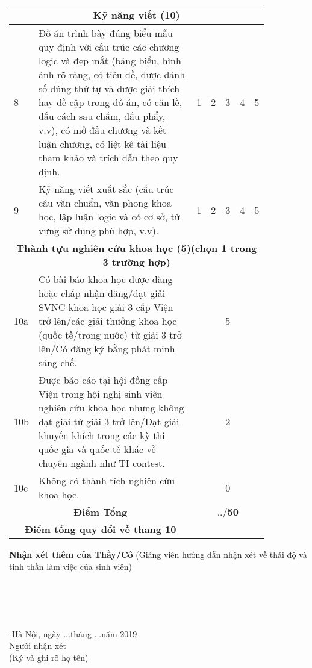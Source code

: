 \begin{longtable}{| m{0.035\linewidth} | m{0.7\linewidth} | m{0.02\linewidth} | m{0.02\linewidth}| m{0.02\linewidth}|  m{0.02\linewidth} | m{0.02\linewidth} |}
	\multicolumn{7}{|c|}{\textbf{Kỹ năng viết (10)}} \\ \hline
	8 & Đồ án trình bày đúng biểu mẫu quy định với cấu trúc các chương logic và đẹp mắt (bảng biểu, hình ảnh rõ ràng, có tiêu đề, được đánh số đúng thứ tự và được giải thích hay đề cập trong đồ án, có căn lề, dấu cách sau chấm, dấu phẩy, v.v), có mở đầu chương và kết luận chương, có liệt kê tài liệu tham khảo và trích dẫn theo quy định. & 1 & 2 & 3 & 4 & 5 \\ \hline
    9 & Kỹ năng viết xuất sắc (cấu trúc câu văn chuẩn, văn phong khoa học, lập luận logic và có cơ sở, từ vựng sử dụng phù hợp, v.v). & 1 & 2 & 3 & 4 & 5 \\ \hline   
    \multicolumn{7}{|c|}{\textbf{Thành tựu nghiên cứu khoa học (5)(chọn 1 trong 3 trường hợp)}} \\ \hline
	10a & Có bài báo khoa học được đăng hoặc chấp nhận đăng/đạt giải SVNC khoa học giải 3 cấp Viện trở lên/các giải thưởng khoa học (quốc tế/trong nước) từ giải 3 trở lên/Có đăng ký bằng phát minh sáng chế. & \multicolumn{5}{c|}{5} \\ \hline
    10b & Được báo cáo tại hội đồng cấp Viện trong hội nghị sinh viên nghiên cứu khoa học nhưng không đạt giải từ giải 3 trở lên/Đạt giải khuyến khích trong các kỳ thi quốc gia và quốc tế khác về chuyên ngành như TI contest. & \multicolumn{5}{c|}{2} \\ \hline 
    10c & Không có thành tích nghiên cứu khoa học. & \multicolumn{5}{c|}{0} \\ \hline 
    \multicolumn{2}{|c|}{\textbf{Điểm Tổng}} & \multicolumn{5}{c|}{../\textbf{50}} \\ \hline
    \multicolumn{2}{|c|}{\textbf{Điểm tổng quy đổi về thang 10 }} & \multicolumn{5}{c|}{} \\ \hline
	\end{longtable}    
\thispagestyle{plain}
\noindent\textbf{Nhận xét thêm của Thầy/Cô} (Giảng viên hướng dẫn nhận xét về thái độ và tinh thần làm việc của sinh viên) \\
\dotline[4pt]{\linewidth} \\
 \dotline[4pt]{\linewidth}\\
  \dotline[4pt]{\linewidth} \\
   \dotline[4pt]{\linewidth} \\
    \dotline[4pt]{\linewidth}
 
 \begin{tabbing}
 \hspace{9cm}\=\kill
   \> Hà Nội, ngày ...tháng ...năm 2019 \\ 
   \>  \hspace{1.5cm}    Người nhận xét\\ 
   \>   \hspace{1cm}  (Ký và ghi rõ họ tên)		
 \end{tabbing} 

